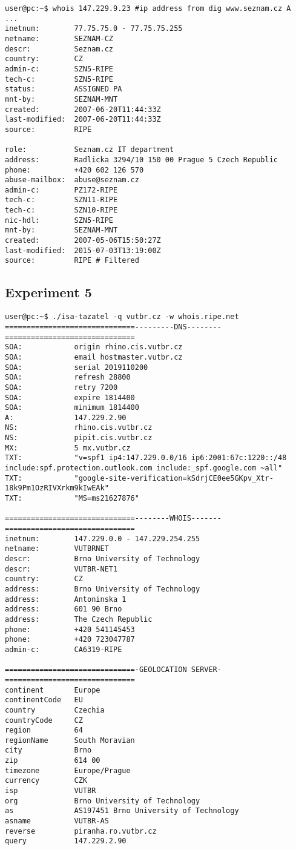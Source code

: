 \documentclass[a4paper, 11pt]{article}
\begin{document}
\begin{lstlisting}[caption={Referenčný Whois dotaz nad doménov \textbf{www.seznam.cz}.},captionpos=b, label={whois_refer_4}]
user@pc:~$ whois 147.229.9.23 #ip address from dig www.seznam.cz A
...
inetnum:        77.75.75.0 - 77.75.75.255
netname:        SEZNAM-CZ
descr:          Seznam.cz
country:        CZ
admin-c:        SZN5-RIPE
tech-c:         SZN5-RIPE
status:         ASSIGNED PA
mnt-by:         SEZNAM-MNT
created:        2007-06-20T11:44:33Z
last-modified:  2007-06-20T11:44:33Z
source:         RIPE

role:           Seznam.cz IT department
address:        Radlicka 3294/10 150 00 Prague 5 Czech Republic
phone:          +420 602 126 570
abuse-mailbox:  abuse@seznam.cz
admin-c:        PZ172-RIPE
tech-c:         SZN11-RIPE
tech-c:         SZN10-RIPE
nic-hdl:        SZN5-RIPE
mnt-by:         SEZNAM-MNT
created:        2007-05-06T15:50:27Z
last-modified:  2015-07-03T13:19:00Z
source:         RIPE # Filtered
\end{lstlisting}

\subsection{Experiment 5}\label{experiment_5}
\begin{lstlisting}[caption={Výsledok dotazu nad doménov \textbf{vutbr.cz}.},captionpos=b, label={test_app_5}]
user@pc:~$ ./isa-tazatel -q vutbr.cz -w whois.ripe.net
==============================---------DNS--------==============================
SOA:            origin rhino.cis.vutbr.cz
SOA:			email hostmaster.vutbr.cz
SOA:			serial 2019110200
SOA:			refresh 28800
SOA:			retry 7200
SOA:			expire 1814400
SOA:			minimum 1814400
A:              147.229.2.90
NS:             rhino.cis.vutbr.cz
NS:             pipit.cis.vutbr.cz
MX:             5 mx.vutbr.cz
TXT:            "v=spf1 ip4:147.229.0.0/16 ip6:2001:67c:1220::/48 include:spf.protection.outlook.com include:_spf.google.com ~all"
TXT:            "google-site-verification=kSdrjCE0ee5GKpv_Xtr-18k9Pm1OzRIVXrkm9kIwEAk"
TXT:            "MS=ms21627876"

==============================--------WHOIS-------==============================
inetnum:        147.229.0.0 - 147.229.254.255
netname:        VUTBRNET
descr:          Brno University of Technology
descr:          VUTBR-NET1
country:        CZ
address:        Brno University of Technology
address:        Antoninska 1
address:        601 90 Brno
address:        The Czech Republic
phone:          +420 541145453
phone:          +420 723047787
admin-c:        CA6319-RIPE

==============================-GEOLOCATION SERVER-==============================
continent       Europe
continentCode   EU
country         Czechia
countryCode     CZ
region          64
regionName      South Moravian
city            Brno
zip             614 00
timezone        Europe/Prague
currency        CZK
isp             VUTBR
org             Brno University of Technology
as              AS197451 Brno University of Technology
asname          VUTBR-AS
reverse         piranha.ro.vutbr.cz
query           147.229.2.90
\end{lstlisting}
\end{document}
